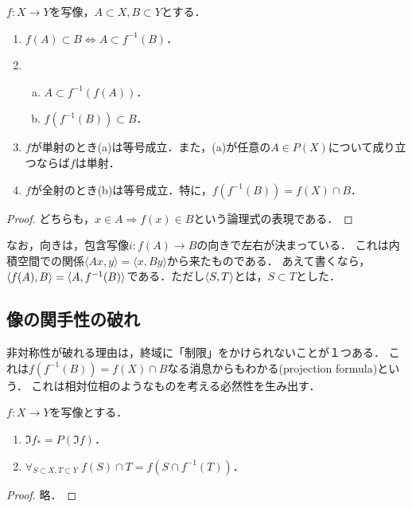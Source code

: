 \documentclass[uplatex,dvipdfmx]{jsreport}
\begin{document}
\begin{proposition}[adjunction]\label{prop-adjunction}
    $f:X\to Y$を写像，$A\subset X,B\subset Y$とする．
    \begin{enumerate}
        \item $f(A)\subset B\Leftrightarrow A\subset f^{-1}(B)$．
        \item \begin{enumerate}[(a)]
            \item $A\subset f^{-1}(f(A))$．
            \item $f(f^{-1}(B))\subset B$．
        \end{enumerate}
        \item $f$が単射のとき(a)は等号成立．また，(a)が任意の$A\in P(X)$について成り立つならば$f$は単射．
        \item $f$が全射のとき(b)は等号成立．特に，$f(f^{-1}(B))=f(X)\cap B$．
    \end{enumerate}
\end{proposition}
\begin{proof}
    どちらも，$x\in A\Rightarrow f(x)\in B$という論理式の表現である．
\end{proof}

\begin{remarks}[随伴の向きについて]
    なお，向きは，包含写像$i:f(A)\to B$の向きで左右が決まっている．
    これは内積空間での関係$\langle Ax,y\rangle=\langle x,By\rangle$から来たものである．
    あえて書くなら，$\langle f(A),B\rangle=\langle A,f^{-1}(B)\rangle$である．ただし$\langle S,T\rangle$とは，$S\subset T$とした．
\end{remarks}

\subsection{像の関手性の破れ}

\begin{tcolorbox}[colframe=ForestGreen, colback=ForestGreen!10!white,breakable,colbacktitle=ForestGreen!40!white,coltitle=black,fonttitle=\bfseries\sffamily,
title=]
    非対称性が破れる理由は，終域に「制限」をかけられないことが１つある．
    これは$f(f^{-1}(B))=f(X)\cap B$なる消息からもわかる(projection formula)という．
    これは相対位相のようなものを考える必然性を生み出す．
\end{tcolorbox}

\begin{problem}[像の値域]
    $f:X\to Y$を写像とする．
    \begin{enumerate}
        \item $\Im f_*=P(\Im f)$．
        \item $\forall_{S\subset X,T\subset Y}\;f(S)\cap T=f(S\cap f^{-1}(T))$．
    \end{enumerate}
\end{problem}
\begin{proof}
    略．
\end{proof}
\end{document}

